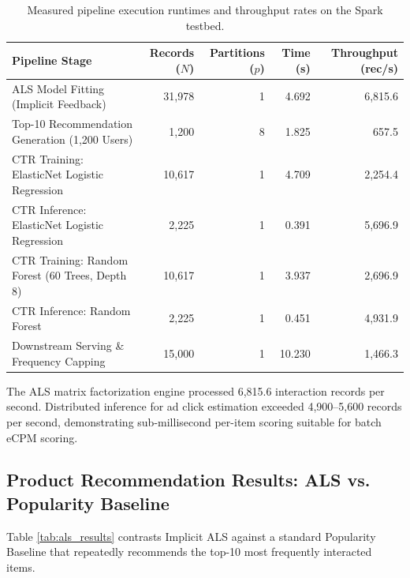 \documentclass[10pt,a4paper,twoside]{article}
\begin{document}
\begin{table}[ht]
\centering
\small
\caption{Measured pipeline execution runtimes and throughput rates on the Spark testbed.}
\label{tab:pipeline_profile}
\begin{tabular}{lrrrr}
\toprule
\textbf{Pipeline Stage} & \textbf{Records ($N$)} & \textbf{Partitions ($p$)} & \textbf{Time (s)} & \textbf{Throughput (rec/s)} \\
\midrule
ALS Model Fitting (Implicit Feedback) & 31,978 & 1 & 4.692 & 6,815.6 \\
Top-10 Recommendation Generation (1,200 Users) & 1,200 & 8 & 1.825 & 657.5 \\
CTR Training: ElasticNet Logistic Regression & 10,617 & 1 & 4.709 & 2,254.4 \\
CTR Inference: ElasticNet Logistic Regression & 2,225 & 1 & 0.391 & 5,696.9 \\
CTR Training: Random Forest (60 Trees, Depth 8) & 10,617 & 1 & 3.937 & 2,696.9 \\
CTR Inference: Random Forest & 2,225 & 1 & 0.451 & 4,931.9 \\
Downstream Serving \& Frequency Capping & 15,000 & 1 & 10.230 & 1,466.3 \\
\bottomrule
\end{tabular}
\end{table}

The ALS matrix factorization engine processed 6,815.6 interaction records per second. Distributed inference for ad click estimation exceeded 4,900--5,600 records per second, demonstrating sub-millisecond per-item scoring suitable for batch eCPM scoring.

\subsection{Product Recommendation Results: ALS vs. Popularity Baseline}
Table \ref{tab:als_results} contrasts Implicit ALS against a standard Popularity Baseline that repeatedly recommends the top-10 most frequently interacted items.
\end{document}
